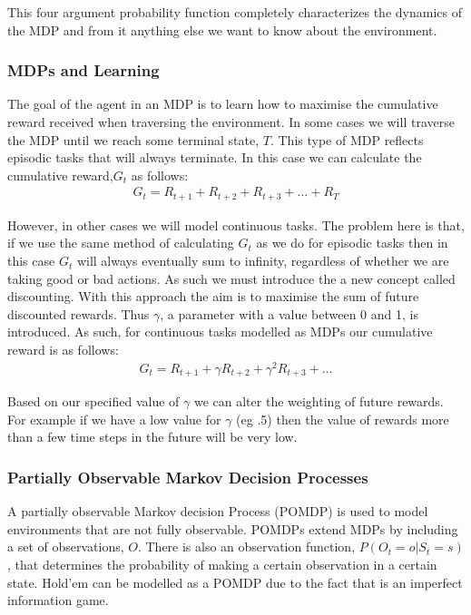This four argument probability function completely characterizes the dynamics of the MDP and from it anything
else we want to know about the environment\citep{sutton1998reinforcement}.

\subsubsection{MDPs and Learning}
The goal of the agent in an MDP is to learn how to maximise the cumulative reward received when traversing
the environment.
In some cases we will traverse the MDP until we reach some terminal state, $T$.
This type of MDP reflects episodic tasks that will always terminate.
In this case we can calculate the cumulative reward,$G_t$ as follows:
\begin{align}
    G_t = R_{t+1}+R_{t+2}+R_{t+3}+\dots+R_T
\end{align}

However, in other cases we will model continuous tasks.
The problem here is that, if we use the same method of calculating $G_t$ as we do for
episodic tasks then in this case $G_t$ will always eventually sum to infinity, regardless
of whether we are taking good or bad actions.
As such we must introduce the a new concept called discounting.
With this approach the aim is to maximise the sum of future discounted rewards.
Thus $\gamma$, a parameter with a value between 0 and 1, is introduced.
As such, for continuous tasks modelled as MDPs our cumulative reward is as follows:
\begin{align}
    G_t = R_{t+1}+\gamma R_{t+2}+\gamma^{2}R_{t+3}+\dots
\end{align}

Based on our specified value of $\gamma$ we can alter the weighting of future rewards.
For example if we have a low value for $\gamma$ (eg .5) then the value of rewards more than a
few time steps in the future will be very low.

\subsubsection{Partially Observable Markov Decision Processes}
A partially observable Markov decision Process (POMDP) is used to model environments that are not
fully observable\citep{kaelbling1996reinforcement}.
POMDPs extend MDPs by including a set of observations, $O$.
There is also an observation function, $P(O_t=o|S_t=s)$, that determines the probability of making a certain observation
in a certain state.
Hold'em can be modelled as a POMDP due to the fact that is an imperfect information game.

